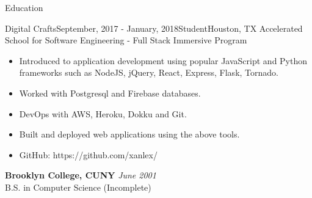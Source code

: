 \documentclass{resume} %
\begin{document}
 \begin{rSection}{Education}
 \begin{rSubsection}{Digital Crafts}{September, 2017 - January, 2018}{Student}{Houston, TX}
 	Accelerated School for Software Engineering - Full Stack Immersive Program
  	\begin{itemize}
	\item {Introduced to application development using popular JavaScript and Python frameworks such as NodeJS, jQuery, 	React, Express, Flask, Tornado.}
	\item {Worked with Postgresql and Firebase databases.}
	\item {DevOps with AWS, Heroku, Dokku and Git.}
	\item Built and deployed web applications using the above tools.
	\item GitHub: {https://github.com/xanlex/}

 \end{itemize}
\end{rSubsection}


 {\bf Brooklyn College, CUNY} \hfill {\em June 2001} \\
 	B.S. in Computer Science (Incomplete)

 \end{rSection}

\end{document}
